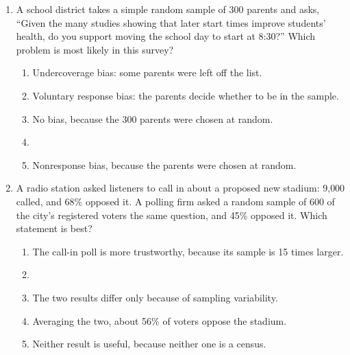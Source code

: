 \documentclass[12pt]{article}
\begin{document}
\begin{enumerate}[leftmargin=1.9em, itemsep=0.13in]
  \boxguard[14]
  \item A school district takes a simple random sample of 300 parents and asks, ``Given the many
        studies showing that later start times improve students' health, do you support moving
        the school day to start at 8:30?'' Which problem is most likely in this survey?
        \begin{enumerate}[label=\textbf{(\Alph*)}, leftmargin=2.2em, itemsep=2pt]
          \item Undercoverage bias: some parents were left off the list.
          \item Voluntary response bias: the parents decide whether to be in the sample.
          \item No bias, because the 300 parents were chosen at random.
          \item {}
          \item Nonresponse bias, because the parents were chosen at random.\hfill{}\rule[-0.2in]{0pt}{0.48in}
        \end{enumerate}

  \boxguard[14]
  \item A radio station asked listeners to call in about a proposed new stadium: 9{,}000 called,
        and 68\% opposed it. A polling firm asked a random sample of 600 of the city's
        registered voters the same question, and 45\% opposed it. Which statement is best?
        \begin{enumerate}[label=\textbf{(\Alph*)}, leftmargin=2.2em, itemsep=2pt]
          \item The call-in poll is more trustworthy, because its sample is 15 times larger.
          \item {}
          \item The two results differ only because of sampling variability.
          \item Averaging the two, about 56\% of voters oppose the stadium.
          \item Neither result is useful, because neither one is a census.\hfill{}\rule[-0.2in]{0pt}{0.48in}
        \end{enumerate}


\end{enumerate}
\end{document}
